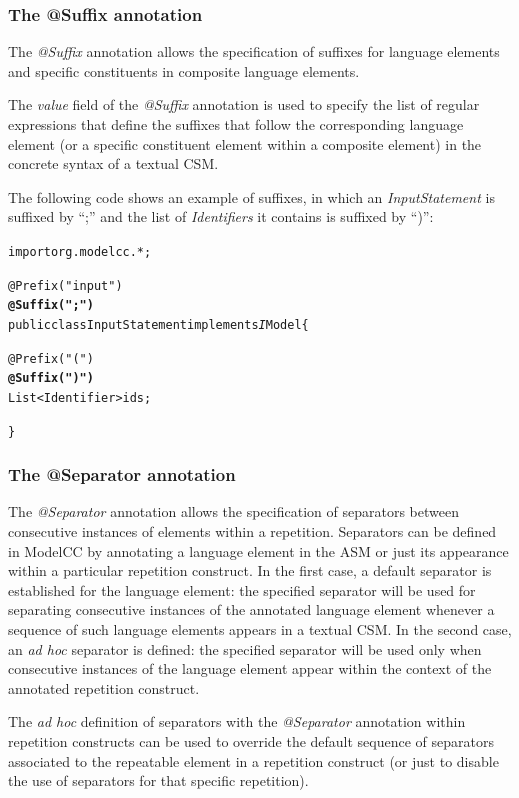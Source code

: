 \documentclass[a4paper,twoside,onecolumn]{article}
\newenvironment{colframe}{%
  \begin{Sbox} 
    \begin{minipage}{.8\columnwidth} 
}{%

  \end{minipage} 
  \end{Sbox} 
  \begin{center} 
    \fcolorbox{black}{MyGray}{\TheSbox} 
  \end{center} 
}
\newcommand{\an}[1]{\emph{#1}} %
\begin{document}
\subsubsection{The @Suffix annotation}

The \an{@Suffix} annotation allows the specification of suffixes for language elements and specific constituents in composite language elements.

The \emph{value} field of the \an{@Suffix} annotation is used to specify the list of regular expressions that define the suffixes that follow
the corresponding language element (or a specific constituent element within a composite element) in the concrete syntax of a textual CSM.

The following code shows an example of suffixes, in which an \emph{InputStatement} is suffixed by ``;'' and the list of \emph{Identifiers} it contains is suffixed by ``)'':

\begin{colframe}
\begin{alltt}
import org.modelcc.*;

@Prefix("input")
{\bf\unskip @Suffix(";")}
public class InputStatement implements{\emph IModel} \{

  @Prefix("(")
  {\bf\unskip @Suffix(")")}
  List<Identifier> ids;

\}
\end{alltt}
\end{colframe}

\subsubsection{The @Separator annotation}

The \an{@Separator} annotation allows the specification of separators between consecutive instances of elements within a repetition. Separators
can be defined in ModelCC by annotating a language element in the ASM or just its appearance within a particular repetition construct. In the
first case, a default separator is established for the language element: the specified separator will be used for separating consecutive
instances of the annotated language element whenever a sequence of such language elements appears in a textual CSM. In the second case, an
\emph{ad hoc} separator is defined: the specified separator will be used only when consecutive instances of the language element appear within
the context of the annotated repetition construct.

The \emph{ad hoc} definition of separators with the \an{@Separator} annotation within repetition constructs can be used to override the default
sequence of separators associated to the repeatable element in a repetition construct (or just to disable the use of separators for that
specific repetition).
\end{document}
